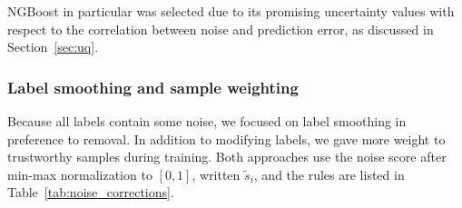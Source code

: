 NGBoost in particular was selected due to its promising uncertainty values with respect to the correlation between noise and prediction error, as discussed in Section~\ref{sec:uq}.  

\subsubsection{Label smoothing and sample weighting}

Because all labels contain some noise, we focused on label smoothing in preference to removal. In addition to modifying labels, we gave more weight to trustworthy samples during training. Both approaches use the noise score after min-max normalization to $[0, 1]$, written $\tilde s_i$, and the rules are listed in Table~\ref{tab:noise_corrections}.

